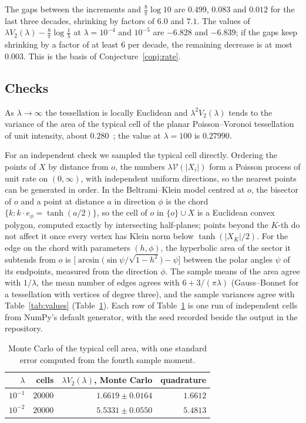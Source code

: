 \documentclass[11pt]{amsart}
\theoremstyle{remark}
\begin{document}
The gaps between the increments and $\frac8\pi\log10$ are $0.499$, $0.083$ and $0.012$ for the last three decades,
shrinking by factors of $6.0$ and $7.1$. The values of $\lambda V_2(\lambda)-\frac8\pi\log\frac1\lambda$ at
$\lambda=10^{-4}$ and $10^{-5}$ are $-6.828$ and $-6.839$; if the gaps keep shrinking by a factor of at least $6$ per
decade, the remaining decrease is at most $0.003$. This is the basis of Conjecture~\ref{conj:rate}.

\subsection{Checks}
As $\lambda\to\infty$ the tessellation is locally Euclidean and $\lambda^2V_2(\lambda)$ tends to the variance of the
area of the typical cell of the planar Poisson--Voronoi tessellation of unit intensity, about $0.280$~\cite{Gilbert};
the value at $\lambda=100$ is $0.27990$.

For an independent check we sampled the typical cell directly. Ordering the points of $X$ by distance from $o$, the
numbers $\lambda\mathcal V(|X_i|)$ form a Poisson process of unit rate on $(0,\infty)$, with independent uniform
directions, so the nearest points can be generated in order. In the Beltrami--Klein model centred at $o$, the bisector
of $o$ and a point at distance $a$ in direction $\phi$ is the chord $\{k:k\cdot e_\phi=\tanh(a/2)\}$, so the cell of $o$
in $\{o\}\cup X$ is a Euclidean convex polygon, computed exactly by intersecting half-planes; points beyond the $K$-th do
not affect it once every vertex has Klein norm below $\tanh(|X_K|/2)$. For the edge on the chord with parameters
$(h,\phi)$, the hyperbolic area of the sector it subtends from $o$ is $\bigl[\arcsin\bigl(\sin\psi/\sqrt{1-h^2}\bigr)-
\psi\bigr]$ between the polar angles $\psi$ of its endpoints, measured from the direction $\phi$. The sample means of the area agree with
$1/\lambda$, the mean number of edges agrees with $6+3/(\pi\lambda)$ (Gauss--Bonnet for a tessellation with vertices of
degree three), and the sample variances agree with Table~\ref{tab:values} (Table~\ref{tab:mc}). Each row of
Table~\ref{tab:mc} is one run of independent cells from NumPy's default generator, with the seed recorded beside the
output in the repository.

\begin{table}[tbp]
\centering
\begin{tabular}{rrrr}
\toprule
$\lambda$ & cells & $\lambda V_2(\lambda)$, Monte Carlo & quadrature \\
\midrule
$10^{-1}$ & $20000$ & $1.6619\pm0.0164$ & $1.6612$ \\
$10^{-2}$ & $20000$ & $5.5331\pm0.0550$ & $5.4813$ \\
\bottomrule
\end{tabular}
\caption{Monte Carlo of the typical cell area, with one standard error computed from the fourth sample moment.}
\label{tab:mc}
\end{table}
\end{document}

